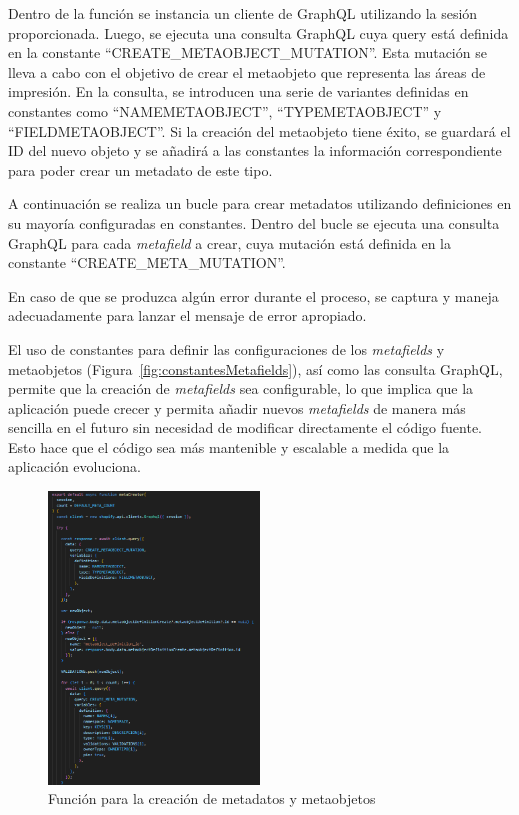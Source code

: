 \documentclass[12pt]{article}
\begin{document}
Dentro de la función se instancia un cliente de GraphQL utilizando la sesión proporcionada. Luego, se ejecuta una consulta GraphQL cuya query está definida en la constante ``CREATE\_METAOBJECT\_MUTATION''.  
Esta mutación se lleva a cabo con el objetivo de crear el metaobjeto que representa las áreas de impresión. En la consulta, se introducen una serie de variantes definidas en constantes como ``NAMEMETAOBJECT'', 
``TYPEMETAOBJECT'' y ``FIELDMETAOBJECT''. Si la creación del metaobjeto tiene éxito, se guardará el ID del nuevo objeto y se añadirá a las constantes 
la información correspondiente para poder crear un metadato de este tipo.

A continuación se realiza un bucle para crear metadatos utilizando definiciones en su mayoría configuradas en constantes. Dentro del bucle se ejecuta una consulta GraphQL para cada \textit{metafield} a crear, cuya mutación
está definida en la constante  ``CREATE\_META\_MUTATION''.

En caso de que se produzca algún error durante el proceso, se captura y maneja adecuadamente para lanzar el mensaje de error apropiado.

El uso de constantes para definir las configuraciones de los \textit{metafields} y metaobjetos (Figura~\ref{fig:constantesMetafields}), así como las consulta GraphQL, permite que la creación
de \textit{metafields} sea configurable, lo que implica que la aplicación puede crecer y permita añadir nuevos \textit{metafields} de manera más sencilla en el futuro 
sin necesidad de modificar directamente el código fuente. Esto hace que el código sea más mantenible y escalable a medida que la 
aplicación evoluciona.


\begin{figure}[ht]
    \centering
    \includegraphics[width=0.5\textwidth]{imagenes-back/funcionmetaCreator.png}
    \caption{\label{fig:funcionMetafields} Función para la creación de metadatos y metaobjetos}
    \vspace{\fill}
\end{figure}
\end{document}
